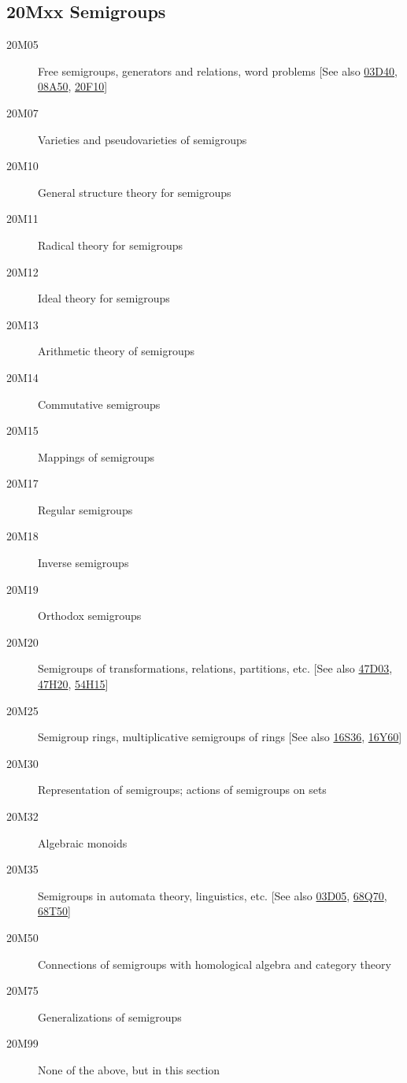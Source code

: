 \documentclass[letterpaper]{article}
\begin{document}
\subsection*{20Mxx  Semigroups }\label{20Mxx}
\begin{description}  
\item [20M05]\label{20M05} Free semigroups, generators and relations, word problems [See also \hyperref[03D40]{03D40}, \hyperref[08A50]{08A50}, \hyperref[20F10]{20F10}]
\item [20M07]\label{20M07} Varieties and pseudovarieties of semigroups
\item [20M10]\label{20M10} General structure theory for semigroups
\item [20M11]\label{20M11} Radical theory for semigroups
\item [20M12]\label{20M12} Ideal theory for semigroups
\item [20M13]\label{20M13} Arithmetic theory of semigroups
\item [20M14]\label{20M14} Commutative semigroups
\item [20M15]\label{20M15} Mappings of semigroups
\item [20M17]\label{20M17} Regular semigroups
\item [20M18]\label{20M18} Inverse semigroups
\item [20M19]\label{20M19} Orthodox semigroups
\item [20M20]\label{20M20} Semigroups of transformations, relations, partitions, etc. [See also \hyperref[47D03]{47D03}, \hyperref[47H20]{47H20}, \hyperref[54H15]{54H15}]
\item [20M25]\label{20M25} Semigroup rings, multiplicative semigroups of rings [See also \hyperref[16S36]{16S36}, \hyperref[16Y60]{16Y60}]
\item [20M30]\label{20M30} Representation of semigroups; actions of semigroups on sets
\item [20M32]\label{20M32} Algebraic monoids
\item [20M35]\label{20M35} Semigroups in automata theory, linguistics, etc. [See also \hyperref[03D05]{03D05}, \hyperref[68Q70]{68Q70}, \hyperref[68T50]{68T50}]
\item [20M50]\label{20M50} Connections of semigroups with homological algebra and category theory
\item [20M75]\label{20M75} Generalizations of semigroups
\item [20M99]\label{20M99} None of the above, but in this section
\end{description}
\end{document}

